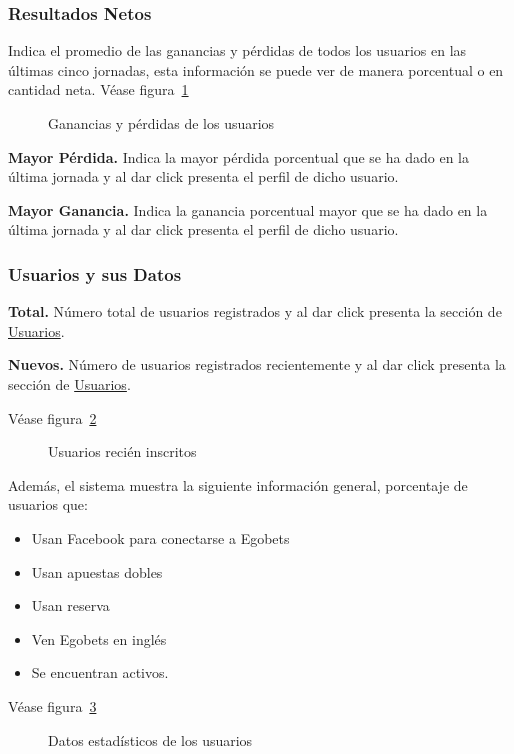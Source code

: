 \subsubsection{Resultados Netos}

Indica el promedio de las ganancias y pérdidas de todos los usuarios en las últimas cinco jornadas, esta información se puede ver de manera porcentual o en cantidad neta.
Véase figura~\ref{Fig:mayor-ganancia}
\begin{figure}[!htb]\centering
   \begin {minipage}{0.4\textwidth}
     \caption{Ganancias y pérdidas de los usuarios}
	 \label{Fig:mayor-ganancia}
   \end{minipage}
\end{figure}


\textbf{Mayor Pérdida.}
Indica la mayor pérdida porcentual que se ha dado en la última jornada y al dar click presenta el perfil de dicho usuario.

\textbf{Mayor Ganancia.}
Indica la ganancia porcentual mayor que se ha dado en la última jornada y al dar click presenta el perfil de dicho usuario.


\subsubsection{Usuarios y sus Datos}

\textbf{Total.} Número total de usuarios registrados y al dar click presenta la sección de \underline{Usuarios}.

\textbf{Nuevos.} Número de usuarios registrados recientemente y al dar click presenta la sección de \underline{Usuarios}.

Véase figura~\ref{Fig:nuevos-usuarios}
\begin{figure}[!htb]\centering
   \begin {minipage}{0.4\textwidth}
     \caption{Usuarios recién inscritos}
	 \label{Fig:nuevos-usuarios}
   \end{minipage}
\end{figure}

Además, el sistema muestra la siguiente información general, porcentaje de usuarios que:
\begin{itemize}
	\item Usan Facebook para conectarse a Egobets
	\item Usan apuestas dobles
	\item Usan reserva
	\item Ven Egobets en inglés
	\item Se encuentran activos.
\end{itemize}
Véase figura~\ref{Fig:graficas-usuarios}
\begin{figure}[!htb]\centering
   \begin {minipage}{1\textwidth}
     \caption{Datos estadísticos de los usuarios}
	 \label{Fig:graficas-usuarios}
   \end{minipage}
\end{figure}
 
